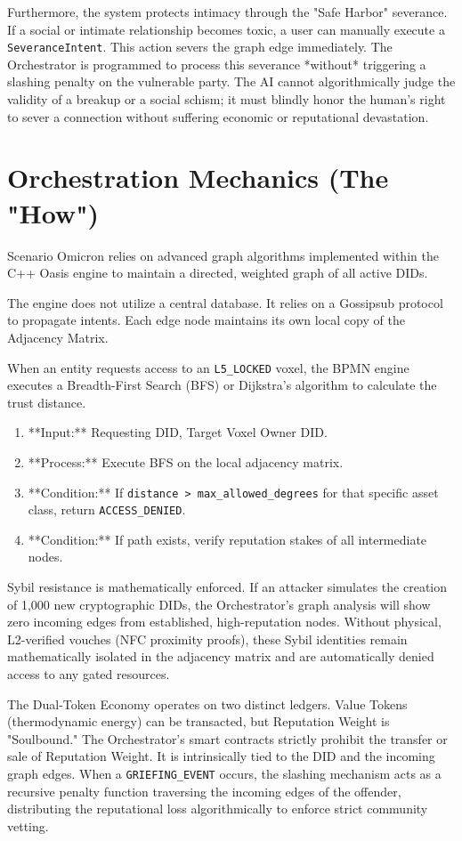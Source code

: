 Furthermore, the system protects intimacy through the "Safe Harbor" severance. If a social or intimate relationship becomes toxic, a user can manually execute a \texttt{SeveranceIntent}. This action severs the graph edge immediately. The Orchestrator is programmed to process this severance *without* triggering a slashing penalty on the vulnerable party. The AI cannot algorithmically judge the validity of a breakup or a social schism; it must blindly honor the human's right to sever a connection without suffering economic or reputational devastation.

\section{Orchestration Mechanics (The "How")}
Scenario Omicron relies on advanced graph algorithms implemented within the C++ Oasis engine to maintain a directed, weighted graph of all active DIDs.

The engine does not utilize a central database. It relies on a Gossipsub protocol to propagate intents. Each edge node maintains its own local copy of the Adjacency Matrix. 

When an entity requests access to an \texttt{L5\_LOCKED} voxel, the BPMN engine executes a Breadth-First Search (BFS) or Dijkstra's algorithm to calculate the trust distance.
\begin{enumerate}
    \item **Input:** Requesting DID, Target Voxel Owner DID.
    \item **Process:** Execute BFS on the local adjacency matrix.
    \item **Condition:** If \texttt{distance > max\_allowed\_degrees} for that specific asset class, return \texttt{ACCESS\_DENIED}.
    \item **Condition:** If path exists, verify reputation stakes of all intermediate nodes.
\end{enumerate}

Sybil resistance is mathematically enforced. If an attacker simulates the creation of 1,000 new cryptographic DIDs, the Orchestrator's graph analysis will show zero incoming edges from established, high-reputation nodes. Without physical, L2-verified vouches (NFC proximity proofs), these Sybil identities remain mathematically isolated in the adjacency matrix and are automatically denied access to any gated resources.

The Dual-Token Economy operates on two distinct ledgers. Value Tokens (thermodynamic energy) can be transacted, but Reputation Weight is "Soulbound." The Orchestrator's smart contracts strictly prohibit the transfer or sale of Reputation Weight. It is intrinsically tied to the DID and the incoming graph edges. 
When a \texttt{GRIEFING\_EVENT} occurs, the slashing mechanism acts as a recursive penalty function traversing the incoming edges of the offender, distributing the reputational loss algorithmically to enforce strict community vetting.
